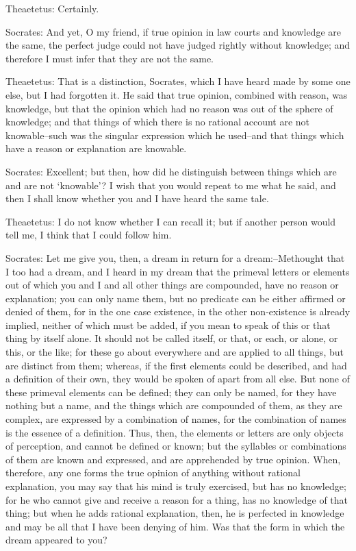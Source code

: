 Theaetetus: Certainly.

Socrates: And yet, O my friend, if true opinion in law courts and
knowledge are the same, the perfect judge could not have judged rightly
without knowledge; and therefore I must infer that they are not the
same.

Theaetetus: That is a distinction, Socrates, which I have heard made
by some one else, but I had forgotten it. He said that true opinion,
combined with reason, was knowledge, but that the opinion which had
no reason was out of the sphere of knowledge; and that things of which
there is no rational account are not knowable--such was the singular
expression which he used--and that things which have a reason or
explanation are knowable.

Socrates: Excellent; but then, how did he distinguish between things
which are and are not `knowable'? I wish that you would repeat to me
what he said, and then I shall know whether you and I have heard the
same tale.

Theaetetus: I do not know whether I can recall it; but if another person
would tell me, I think that I could follow him.

Socrates: Let me give you, then, a dream in return for a
dream:--Methought that I too had a dream, and I heard in my dream that
the primeval letters or elements out of which you and I and all other
things are compounded, have no reason or explanation; you can only name
them, but no predicate can be either affirmed or denied of them, for in
the one case existence, in the other non-existence is already implied,
neither of which must be added, if you mean to speak of this or that
thing by itself alone. It should not be called itself, or that, or each,
or alone, or this, or the like; for these go about everywhere and are
applied to all things, but are distinct from them; whereas, if the first
elements could be described, and had a definition of their own, they
would be spoken of apart from all else. But none of these primeval
elements can be defined; they can only be named, for they have nothing
but a name, and the things which are compounded of them, as they are
complex, are expressed by a combination of names, for the combination
of names is the essence of a definition. Thus, then, the elements or
letters are only objects of perception, and cannot be defined or known;
but the syllables or combinations of them are known and expressed, and
are apprehended by true opinion. When, therefore, any one forms the true
opinion of anything without rational explanation, you may say that his
mind is truly exercised, but has no knowledge; for he who cannot give
and receive a reason for a thing, has no knowledge of that thing; but
when he adds rational explanation, then, he is perfected in knowledge
and may be all that I have been denying of him. Was that the form in
which the dream appeared to you?

